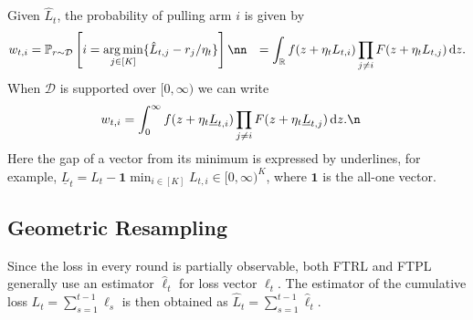 Given $\hat{L}_t$, the probability of pulling arm $i$ is given by
\begin{align}
w_{t,i}
&= \mathbb{P}_{r \sim \mathcal{D}} \left[ i = \mathop{\arg\min}_{j \in [K]} \{\hat{L}_{t,j} - r_j/\eta_t\} \right]\nn
&= \int_{\mathbb{R}} f(z + \eta_t L_{t,i})\prod_{j \neq i} F(z + \eta_t L_{t,j}) \, \mathrm{d}z.
\label{eq_phi}
\end{align}
When $\mathcal{D}$ is supported over $[0,\infty)$
we can write
\begin{align}
w_{t,i}
&= \int_{0}^\infty f(z + \eta_t\underline{L}_{t,i})\prod_{j \neq i} F(z + \eta_t\underline{L}_{t,j}) \, \mathrm{d}z.
\n
\end{align}
Here the gap of a vector from its minimum is expressed by underlines, for example, $\underline{L}_{t}=L_t-\mathbf{1} \min_{i\in\left[K\right]} L_{t,i}\in [0, \infty)^K$, where $\mathbf{1}$ is the all-one vector.




\subsection{Geometric Resampling}
Since the loss in every round is partially observable,
both FTRL and FTPL generally use an estimator $\hat{\ell}_t$ for loss vector $\ell_t$.
The estimator of the cumulative loss $L_t= \sum_{s=1}^{t-1} \ell_s$ is then obtained as $\hat{L}_t=\sum_{s=1}^{t-1} \hat{\ell}_t$.



